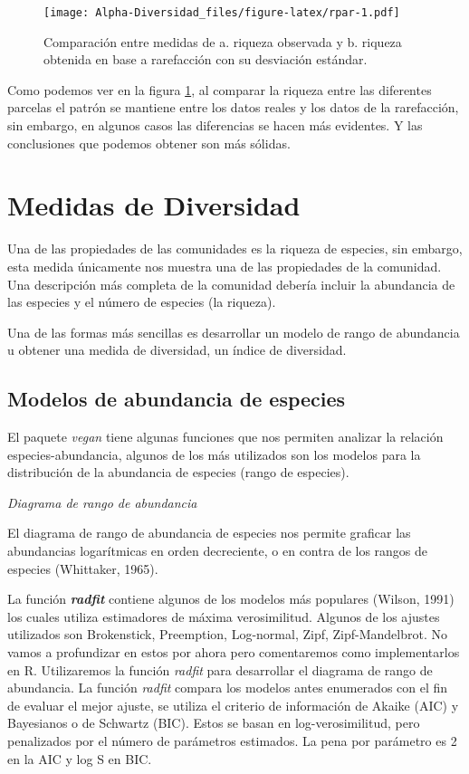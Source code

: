 \documentclass[]{book}
\begin{document}
\begin{figure}[htbp]
\centering
\texttt{[image: Alpha-Diversidad\_files/figure-latex/rpar-1.pdf]}
\caption{\label{fig:rpar}Comparación entre medidas de a. riqueza observada y
b. riqueza obtenida en base a rarefacción con su desviación estándar.}
\end{figure}

Como podemos ver en la figura \ref{fig:rpar}, al comparar la riqueza
entre las diferentes parcelas el patrón se mantiene entre los datos
reales y los datos de la rarefacción, sin embargo, en algunos casos las
diferencias se hacen más evidentes. Y las conclusiones que podemos
obtener son más sólidas.

\chapter{Medidas de Diversidad}\label{medidas-de-diversidad}

Una de las propiedades de las comunidades es la riqueza de especies, sin
embargo, esta medida únicamente nos muestra una de las propiedades de la
comunidad. Una descripción más completa de la comunidad debería incluir
la abundancia de las especies y el número de especies (la riqueza).

Una de las formas más sencillas es desarrollar un modelo de rango de
abundancia u obtener una medida de diversidad, un índice de diversidad.

\section{Modelos de abundancia de
especies}\label{modelos-de-abundancia-de-especies}

El paquete \emph{vegan} tiene algunas funciones que nos permiten
analizar la relación especies-abundancia, algunos de los más utilizados
son los modelos para la distribución de la abundancia de especies (rango
de especies).

\emph{Diagrama de rango de abundancia}

El diagrama de rango de abundancia de especies nos permite graficar las
abundancias logarítmicas en orden decreciente, o en contra de los rangos
de especies (Whittaker, 1965).

La función \textbf{\emph{radfit}} contiene algunos de los modelos más
populares (Wilson, 1991) los cuales utiliza estimadores de máxima
verosimilitud. Algunos de los ajustes utilizados son Brokenstick,
Preemption, Log-normal, Zipf, Zipf-Mandelbrot. No vamos a profundizar en
estos por ahora pero comentaremos como implementarlos en R. Utilizaremos
la función \emph{radfit} para desarrollar el diagrama de rango de
abundancia. La función \emph{radfit} compara los modelos antes
enumerados con el fin de evaluar el mejor ajuste, se utiliza el criterio
de información de Akaike (AIC) y Bayesianos o de Schwartz (BIC). Estos
se basan en log-verosimilitud, pero penalizados por el número de
parámetros estimados. La pena por parámetro es 2 en la AIC y log S en
BIC.
\end{document}
